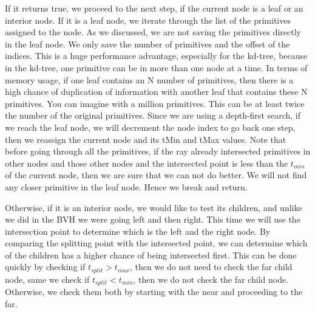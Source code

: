 \documentclass[11pt,a4paper]{article}
\begin{document}
If it returns true, we proceed to the next step, if the current node is a leaf or an interior node. If it is a leaf node, we iterate through the list of the primitives assigned to the node. As we discussed, we are not saving the primitives directly in the leaf node. We only save the number of primitives and the offset of the indices. This is a huge performance advantage, especially for the kd-tree, because in the kd-tree, one primitive can be in more than one node at a time. In terms of memory usage, if one leaf contains an N number of primitives, then there is a high chance of duplication of information with another leaf that contains these N primitives. You can imagine with a million primitives. This can be at least twice the number of the original primitives. Since we are using a depth-first search, if we reach the leaf node, we will decrement the node index to go back one step, then we reassign the current node and its tMin and tMax values. Note that before going through all the primitives, if the ray already intersected primitives in other nodes and those other nodes and the intersected point is less than the $t_{min}$ of the current node, then we are sure that we can not do better. We will not find any closer primitive in the leaf node. Hence we break and return. 
\\
\noindent


Otherwise, if it is an interior node, we would like to test its children, and unlike we did in the BVH we were going left and then right. This time we will use the intersection point to determine which is the left and the right node. By comparing the splitting point with the intersected point, we can determine which of the children has a higher chance of being intersected first. This can be done quickly by checking if $t_{split} > t_{max}$, then we do not need to check the far child node, same we check if $t_{split} < t_{min}$, then we do not check the far child node. Otherwise, we check them both by starting with the near and proceeding to the far. 
\end{document}
